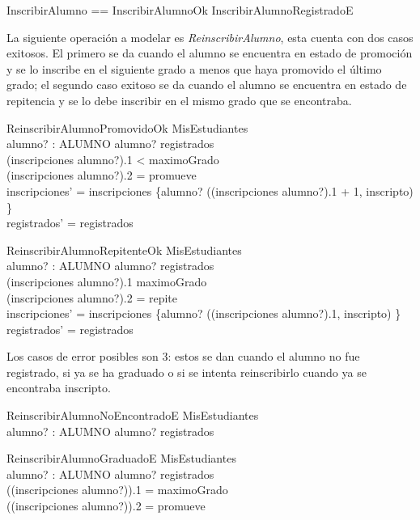 \documentclass{article}
\begin{document}
\begin{zed}
    InscribirAlumno == InscribirAlumnoOk \lor InscribirAlumnoRegistradoE
\end{zed}

La siguiente operación a modelar es \emph{ReinscribirAlumno}, esta cuenta con dos casos exitosos. El primero se da cuando el alumno se encuentra en estado de promoción y se lo inscribe en el siguiente grado a menos que haya promovido el último grado; el segundo caso exitoso se da cuando el alumno se encuentra en estado de repitencia y se lo debe inscribir en el mismo grado que se encontraba.
\begin{schema}{ReinscribirAlumnoPromovidoOk}
    \Delta MisEstudiantes \\
    alumno? : ALUMNO
    \where
    alumno? \in registrados \\
    (inscripciones \; alumno?).1 < maximoGrado \\ 
    (inscripciones \; alumno?).2 = promueve \\
    inscripciones' = inscripciones \oplus \{alumno? \mapsto ((inscripciones \; alumno?).1 + 1, inscripto) \} \\
    registrados' = registrados
\end{schema}

\begin{schema}{ReinscribirAlumnoRepitenteOk}
    \Delta MisEstudiantes \\
    alumno? : ALUMNO
    \where
    alumno? \in registrados \\
    (inscripciones \; alumno?).1 \leq maximoGrado \\ 
    (inscripciones \; alumno?).2 = repite \\
    inscripciones' = inscripciones \oplus \{alumno? \mapsto ((inscripciones \; alumno?).1, inscripto) \} \\
    registrados' = registrados
\end{schema}

Los casos de error posibles son 3: estos se dan cuando el alumno no fue registrado, si ya se ha graduado o si se intenta reinscribirlo cuando ya se encontraba inscripto.

\begin{schema}{ReinscribirAlumnoNoEncontradoE}
    \Xi MisEstudiantes \\
    alumno? : ALUMNO
    \where
    alumno? \notin registrados
\end{schema}

\begin{schema}{ReinscribirAlumnoGraduadoE}
    \Xi MisEstudiantes \\
    alumno? : ALUMNO
    \where
    alumno? \in registrados \\
    ((inscripciones \; alumno?)).1 = maximoGrado \\
    ((inscripciones \; alumno?)).2 = promueve 
\end{schema}
\end{document}
